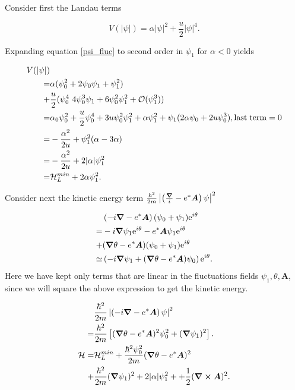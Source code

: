 Consider first the Landau terms 

\begin{equation}
V(|\psi|) = \alpha |\psi|^2 + \frac{u}{2} |\psi|^4.
\label{V_psi}
\end{equation}

Expanding equation \cref{psi_fluc} to second order in $\psi_1$ for $\alpha<0$ yields


\begin{equation}
\begin{aligned}
V(|\psi|) & \\
=& \alpha (\psi_0^2 + 2\psi_0 \psi_1 + \psi_1^2) \\
+& \frac{u}{2} (\psi_0^4  \ 4\psi_0^3 \psi_1 + 6 \psi_0^2 \psi_1^2 + \mathcal{O}(\psi_1^3)) \\
=& \alpha_0 \psi_0^2 + \frac{u}{2} \psi_0^4 + 3u\psi_0^2\psi_1^2 + \alpha \psi_1^2 + \psi_1(2\alpha\psi_0 + 2u\psi_0^3), \mathrm{last}  \; \mathrm{term} = 0 \\
=& -\frac{\alpha^2}{2u} + \psi_1^2(\alpha - 3\alpha) \\
=& -\frac{\alpha^2}{2u} + 2|\alpha| \psi_1^2 \\
=& \mathcal{H}_L^{min} + 2\alpha \psi_1^2.
\label{psi_fluc_expansion}
\end{aligned}
\end{equation}

Consider next the kinetic energy term $\frac{\hbar^2}{2m} \left |\left (\frac{\grad}{i} - e^*\bm{A}\right )\psi \right |^2$

\begin{equation}
\begin{aligned}
& \left (-i\grad - e^*\bm{A}\right )(\psi_0 + \psi_1) \mathrm{e}^{i\theta} \\
=& -i\grad\psi_1  \mathrm{e}^{i\theta} - e^* \bm{A} \psi_1  \mathrm{e}^{i\theta} \\
+& (\grad \theta - e^* \bm{A} )(\psi_0 + \psi_1)  \mathrm{e}^{i\theta} \\
\simeq&  \left (-i\grad\psi_1 + (\grad \theta - e^* \bm{A} ) \psi_0 \right ) \mathrm{e}^{i\theta}.
\label{psi_fluc_expansion_kin}
\end{aligned}
\end{equation}
Here we have kept only terms that are linear in the fluctuations fields $\psi_1, \theta, \bm{A}$, since we will square the above expression to get the kinetic energy. 

\begin{equation}
\begin{aligned}
&\frac{\hbar^2}{2m} \left |\left (-i\grad - e^*\bm{A}\right )\psi \right |^2 \\
=& \frac{\hbar^2}{2m} \left [ (\grad \theta - e^* \bm{A} )^2 \psi_0^2 + (\grad \psi_1)^2 \right ]. \\
\mathcal{H} =& \mathcal{H}_L^{min} + \frac{\hbar^2 \psi_0^2}{2m} (\grad \theta - e^* \bm{A} )^2 \\
 +& \frac{\hbar^2}{2m} (\grad \psi_1)^2 + 2|\alpha| \psi_1^2 + + \frac{1}{2}({\grad} \cross \bm{A} )^2.
\label{H_fluc}
\end{aligned}
\end{equation}

